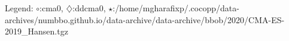 Legend: {\color{NavyBlue}$\circ$}:cma0, {\color{Magenta}$\diamondsuit$}:ddcma0, {\color{Orange}$\star$}:/home/mgharafixp/.cocopp/data-archives/numbbo.github.io/data-archive/data-archive/bbob/2020/CMA-ES-2019\_Hansen.tgz